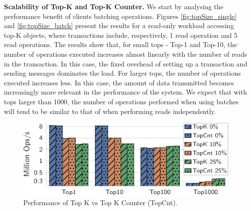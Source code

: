 \documentclass[sigplan,twocolumn,review,anonymous]{acmart}
\begin{document}
\noindent
\textbf{Scalability of Top-K and Top-K Counter.} %
We start by analysing the performance benefit of clients batching operations. %
Figures \ref{fig:topSize_single} and \ref{fig:topSize_batch} present the results for a read-only workload accessing
top-K objects, where transactions include, respectively, 1 read operation and 5 read operations.
The results show that, for small tops - Top-1 and Top-10, the number of operations executed increases almost
linearly with the number of reads in the transaction. In this case, the fixed overhead of setting 
up a transaction and sending messages dominates the load. 
For larger tops, the number of operations executed increases less. In this case, the amount of data 
transmitted becomes increasingly more relevant in the performance of the system.
We expect that with tops larger than 1000, the number of operations performed when using batches will 
tend to be similar to that of when performing reads independently.


%
%
%


\begin{figure}
	\centering
	\includegraphics[width=0.76\linewidth]{singleQuery/topk_vs_topsum_5b}
	\vspace*{-0.6em}
	\caption{Performance of Top K vs Top K Counter (TopCnt).}
	\label{fig:topKVSTopSum}
	\vspace*{-0.75em}
\end{figure}
\end{document}
